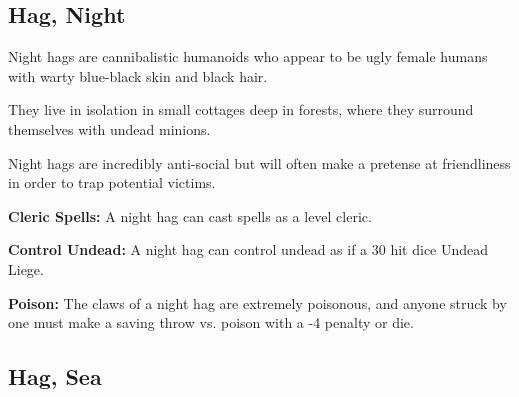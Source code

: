 \begin{multicols*}{2}
\subsection{Hag, Night}

Night hags are cannibalistic humanoids who appear to be ugly female humans with warty blue-black skin and black hair.

They live in isolation in small cottages deep in forests, where they surround themselves with undead minions.

Night hags are incredibly anti-social but will often make a pretense at friendliness in order to trap potential victims.

\textbf{Cleric Spells:} A night hag can cast spells as a  level cleric.

\textbf{Control Undead:} A night hag can control undead as if a 30 hit dice Undead Liege.

\textbf{Poison:} The claws of a night hag are extremely poisonous, and anyone struck by one must make a saving throw vs. poison with a -4 penalty or die.

\subsection{Hag, Sea}
\end{multicols*}
